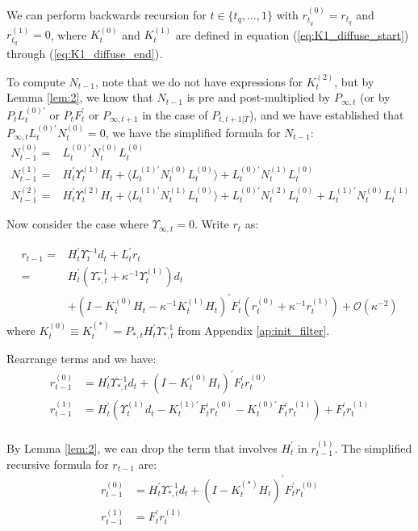 \documentclass[10pt]{article}
\numberwithin{equation}{section}
\begin{document}
We can perform backwards recursion for $t\in\{t_q,...,1\}$ with $r_{t_q}^{(0)}=r_{t_q}$ and $r_{t_q}^{(1)}=0$, where $K_t^{(0)}$ and $K_t^{(1)}$ are defined in equation (\ref{eq:K1_diffuse_start}) through (\ref{eq:K1_diffuse_end}). 

To compute $N_{t-1}$, note that we do not have expressions for $K_t^{(2)}$, but by Lemma \ref{lem:2}, we know that $N_{t-1}$ is pre and post-multiplied by $P_{\infty,t}$ (or by $P_{t}L_{t}^{(0)'}$ or $P_tF_t^{'}$ or $P_{\infty,t+1}$ in the case of $P_{t,t+1|T}$), and we have established that $P_{\infty,t}L_t^{(0)'}N_{t}^{(0)}=0$, we have the simplified formula for $N_{t-1}$:
\begin{align}
    N_{t-1}^{(0)} =& L_t^{(0)'}N_t^{(0)}L_t^{(0)} \label{eq:N_inf_start} \\
    N_{t-1}^{(1)} =& H_t^{'}\Upsilon_t^{(1)}H_t + \langle L_t^{(1)'}N_t^{(0)}L_t^{(0)}\rangle + L_t^{(0)'}N_t^{(1)}L_t^{(0)} \\
    N_{t-1}^{(2)} =& H_t^{'}\Upsilon_t^{(2)}H_t + \langle L_t^{(1)'}N_t^{(1)}L_t^{(0)}\rangle + L_t^{(0)'}N_t^{(2)}L_t^{(0)}
        + L_t^{(1)'}N_t^{(0)}L_t^{(1)} \label{eq:N_inf_end}
\end{align}

Now consider the case where $\Upsilon_{\infty,t}=0$. Write $r_t$ as:

\begin{align*}
    r_{t-1} =& H_t^{'}\Upsilon_t^{-1}d_t + L_t^{'}r_t \\
    =& H_t^{'}(\Upsilon_{*,t}^{-1}+\kappa^{-1}\Upsilon_t^{(1)})d_t \\
    &+(I-K_t^{(0)}H_t-\kappa^{-1}K_t^{(1)}H_t)^{'}F_t^{'}(r_t^{(0)}+\kappa^{-1}r_t^{(1)}) + \mathcal{O}(\kappa^{-2})
\end{align*}
where $K_t^{(0)}\equiv K_t^{(*)}=P_{*,t}H_t^{'}\Upsilon_{*,t}^{-1}$ from Appendix \ref{ap:init_filter}.

Rearrange terms and we have:
\begin{align*}
    r_{t-1}^{(0)} &= H_t^{'}\Upsilon_{*,t}^{-1}d_t + (I-K_{t}^{(0)}H_t)^{'}F_t^{'}r_t^{(0)} \\
    r_{t-1}^{(1)} &= H_t^{'}(\Upsilon_t^{(1)}d_t-K_t^{(1)'}F_t^{'}r_t^{(0)}-K_t^{(0)'}F_t^{'}r_t^{(1)})+F_t^{'}r_t^{(1)} \\
\end{align*}

By Lemma \ref{lem:2}, we can drop the term that involves $H_t^{'}$ in $r_{t-1}^{(1)}$. The simplified recursive formula for $r_{t-1}$ are:
\begin{align}
    r_{t-1}^{(0)} &= H_t^{'}\Upsilon_{*,t}^{-1}d_t + (I-K_{t}^{(*)}H_t)^{'}F_t^{'}r_t^{(0)} \label{eq:r_0_start} \\
    r_{t-1}^{(1)} &= F_t^{'}r_t^{(1)} \label{eq:r_0_end}
\end{align}
\end{document}
